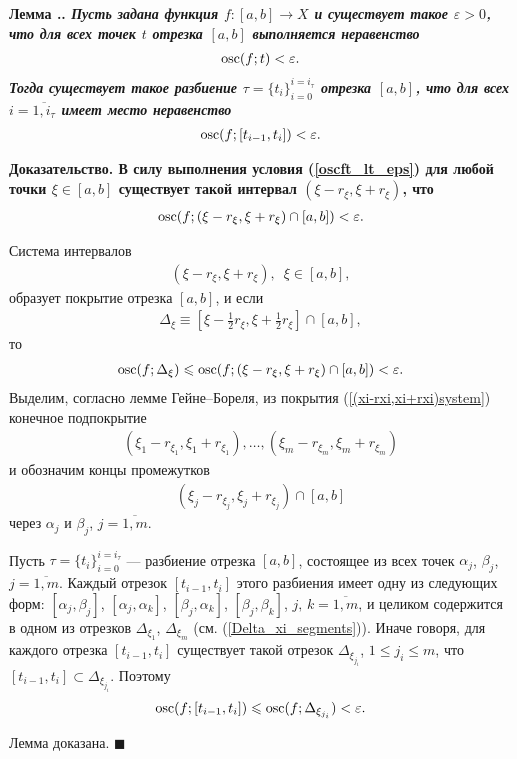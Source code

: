 \documentclass{report}
\newcounter{lem}[section]
\renewcommand{\thelem}{\thesection.\arabic{lem}}
\newenvironment{Lemma}{\par\refstepcounter{lem}\bf Лемма \thelem. \it}{\rm\par}
\newenvironment{Proof}{\par\noindent\bf Доказательство.\rm}{ $\blacksquare$\par}
\newcommand{\osc}{\mathop{\rm osc}\nolimits}
\begin{document}
\begin{Lemma}\label{oscft_lt_eps::Lemma}
Пусть задана функция $f\colon[a,b]\to X$ и существует такое $\varepsilon>0$, что для всех точек $t$ отрезка $[a,b]$ выполняется неравенство
\begin{gather}\label{oscft_lt_eps}
\osc(f;t)<\varepsilon.
\end{gather}
Тогда существует такое разбиение $\tau=\{t_i\}_{i=0}^{i=i_\tau}$ отрезка $[a,b]$, что для всех $i=\overline{1,i_\tau}$ имеет место неравенство
\begin{gather}\label{oscf[t_i-1,t_i]_lt_varepsilon}
\osc(f;[t_{i-1},t_i])<\varepsilon.
\end{gather}
\end{Lemma}
\begin{Proof}
В силу выполнения условия (\ref{oscft_lt_eps}) для любой точки $\xi\in[a,b]$ существует такой интервал $(\xi-r_\xi,\xi+r_\xi)$, что
\begin{gather}\label{oscfxi-rxi,xi+rxicap[a,b]_lt_eps}
\osc(f;(\xi-r_\xi,\xi+r_\xi)\cap[a,b])<\varepsilon.
\end{gather}

Система интервалов
\begin{gather}\label{(xi-rxi,xi+rxi)system}
(\xi-r_\xi,\xi+r_\xi),\,\,\,\xi\in[a,b],
\end{gather}
образует покрытие отрезка $[a,b]$, и если
\begin{gather}\label{Delta_xi_segments}
\Delta_\xi\equiv[\xi-\frac12r_\xi,\xi+\frac12r_\xi]\cap[a,b],
\end{gather}
то
\begin{gather*}
\osc(f;\Delta_\xi)\leqslant\osc(f;(\xi-r_\xi,\xi+r_\xi)\cap[a,b])<\varepsilon.
\end{gather*}
Выделим, согласно лемме Гейне--Бореля, из покрытия (\ref{(xi-rxi,xi+rxi)system}) конечное подпокрытие
\begin{gather*}
(\xi_1-r_{\xi_1},\xi_1+r_{\xi_1}),\dots,(\xi_m-r_{\xi_m},\xi_m+r_{\xi_m})
\end{gather*}
и обозначим концы промежутков
\begin{gather*}
(\xi_j-r_{\xi_j},\xi_j+r_{\xi_j})\cap[a,b]
\end{gather*}
через $\alpha_j$ и $\beta_j$, $j=\overline{1,m}$.

Пусть $\tau=\{t_i\}_{i=0}^{i=i_\tau}$ --- разбиение отрезка $[a,b]$, состоящее из всех точек $\alpha_j$, $\beta_j$, $j=\overline{1,m}$. Каждый отрезок $[t_{i-1},t_i]$ этого разбиения имеет
одну из следующих форм: $[\alpha_j,\beta_j]$, $[\alpha_j,\alpha_k]$, $[\beta_j,\alpha_k]$, $[\beta_j,\beta_k]$, $j,\,k=\overline{1,m}$, и целиком содержится в одном из отрезков
$\Delta_{\xi_1}$, $\Delta_{\xi_m}$ (см. (\ref{Delta_xi_segments})). Иначе говоря, для каждого отрезка $[t_{i-1},t_i]$ существует такой отрезок $\Delta_{\xi_{j_i}}$, $1\leqslant j_i
\leqslant m$, что $[t_{i-1},t_i]\subset\Delta_{\xi_{j_i}}$. Поэтому
\begin{gather*}
\osc(f;[t_{i-1},t_i])\leqslant\osc(f;\Delta_{\xi_{j_i}})<\varepsilon.
\end{gather*}

Лемма доказана.
\end{Proof}
\end{document}

